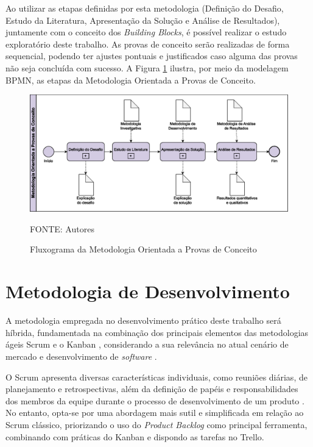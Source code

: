 Ao utilizar as etapas definidas por esta metodologia (Definição do Desafio, Estudo da Literatura, 
Apresentação da Solução e Análise de Resultados), juntamente com o conceito dos \textit{Building Blocks}, 
é possível realizar o estudo exploratório deste trabalho. As provas de conceito serão realizadas de forma 
sequencial, podendo ter ajustes pontuais e justificados caso alguma das provas não seja concluída com 
sucesso. A Figura \ref{metodologia_poc} ilustra, por meio da modelagem BPMN, as etapas da Metodologia Orientada a Provas de Conceito.

\begin{figure}[h]
	\centering
    \caption{Fluxograma da Metodologia Orientada a Provas de Conceito}
	\includegraphics[keepaspectratio=true,scale=0.6]{figuras/metodologia_poc.eps}
    \parbox{\linewidth}{\centering FONTE: Autores}
	\label{metodologia_poc}
\end{figure}

\section{Metodologia de Desenvolvimento}
\label{section:metodologia_desenvolvimento}

A metodologia empregada no desenvolvimento prático deste trabalho será híbrida, 
fundamentada na combinação dos principais elementos das metodologias ágeis Scrum \cite{sutherland2014scrum} 
e o Kanban \cite{ahmad2013kanban}, considerando a sua relevância no atual cenário de 
mercado e desenvolvimento de \textit{software} \cite{carvalho2012aplicaccao}.

O Scrum apresenta diversas características individuais, como reuniões diárias, de planejamento 
e retrospectivas, além da definição de papéis e responsabilidades dos membros da equipe durante 
o processo de desenvolvimento de um produto  \cite{sutherland2014scrum}. No entanto, opta-se 
por uma abordagem mais sutil e simplificada em relação ao Scrum clássico, priorizando o uso 
do \textit{Product Backlog} como principal ferramenta, combinando com práticas do Kanban e dispondo 
as tarefas no Trello.

